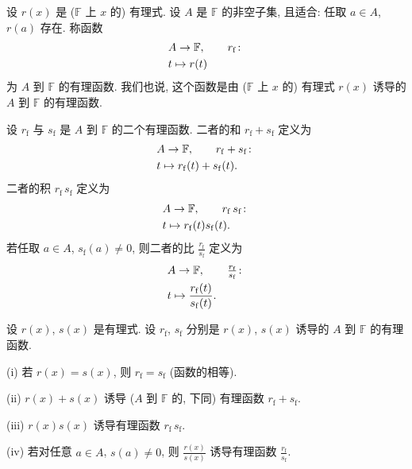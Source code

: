 \begin{definition}
    设 $r(x)$ 是 ($\mathbb{F}$ 上 $x$ 的) 有理式. 设 $A$ 是 $\mathbb{F}$ 的非空子集, 且适合: 任取 $a \in A$, $r(a)$ 存在. 称函数
    \begin{align*}
         & A \to \mathbb{F}, \tag*{$r_\mathrm{f} \colon$} \\
         & t \mapsto r(t)
    \end{align*}
    为 $A$ 到 $\mathbb{F}$ 的有理函数. 我们也说, 这个函数是由 ($\mathbb{F}$ 上 $x$ 的) 有理式 $r(x)$ 诱导的 $A$ 到 $\mathbb{F}$ 的有理函数.
\end{definition}

\begin{definition}
    设 $r_\mathrm{f}$ 与 $s_\mathrm{f}$ 是 $A$ 到 $\mathbb{F}$ 的二个有理函数. 二者的和 $r_\mathrm{f} + s_\mathrm{f}$ 定义为
    \begin{align*}
         & A \to \mathbb{F}, \tag*{$r_\mathrm{f} + s_\mathrm{f} \colon$} \\
         & t \mapsto r_\mathrm{f} (t) + s_\mathrm{f} (t).
    \end{align*}
    二者的积 $r_\mathrm{f} \, s_\mathrm{f}$ 定义为
    \begin{align*}
         & A \to \mathbb{F}, \tag*{$r_\mathrm{f} \, s_\mathrm{f} \colon$} \\
         & t \mapsto r_\mathrm{f} (t) s_\mathrm{f} (t).
    \end{align*}
    若任取 $a \in A$, $s_\mathrm{f} (a) \neq 0$, 则二者的比 $\frac{r_\mathrm{f}}{s_\mathrm{f}}$ 定义为
    \begin{align*}
         & A \to \mathbb{F}, \tag*{$\frac{r_\mathrm{f}}{s_\mathrm{f}} \colon$} \\
         & t \mapsto \frac{r_\mathrm{f} (t)}{s_\mathrm{f} (t)}.
    \end{align*}
\end{definition}

\begin{proposition}
    设 $r(x)$, $s(x)$ 是有理式. 设 $r_\mathrm{f}$, $s_\mathrm{f}$ 分别是 $r(x)$, $s(x)$ 诱导的 $A$ 到 $\mathbb{F}$ 的有理函数.

    (i) 若 $r(x) = s(x)$, 则 $r_\mathrm{f} = s_\mathrm{f}$ (函数的相等).

    (ii) $r(x) + s(x)$ 诱导 ($A$ 到 $\mathbb{F}$ 的, 下同) 有理函数 $r_\mathrm{f} + s_\mathrm{f}$.

    (iii) $r(x) s(x)$ 诱导有理函数 $r_\mathrm{f} \, s_\mathrm{f}$.

    (iv) 若对任意 $a \in A$, $s(a) \neq 0$, 则 $\frac{r(x)}{s(x)}$ 诱导有理函数 $\frac{r_\mathrm{f}}{s_\mathrm{f}}$.
\end{proposition}

